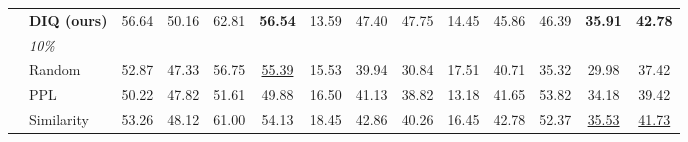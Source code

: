 \documentclass[letterpaper]{article} %
\newcommand{\TableLineColor}{\rowcolor{lightblue}}
\begin{document}
\begin{table}[!t]
\begin{adjustbox}{max width=1.0\textwidth}
\begin{tabular}{llcccccccccccc}
\TableLineColor \cellcolor{white}                   &  \textbf{DIQ (ours)}                                & 56.64                             & 50.16                             & 62.81                             & \textbf{56.54}                       & 13.59                            & 47.40                             & 47.75                             & 14.45                             & 45.86                             & 46.39                             & \textbf{35.91}                       & \textbf{42.78}                       \\ \cmidrule(l){2-14}
                                                    & \textit{10\%}                                      &                                   &                                   &                                   &                                      &                                  &                                   &                                   &                                   &                                   &                                   &                                      &                                      \\
                                                    & Random                                             & 52.87                             & 47.33                             & 56.75                             & \underline{55.39}                                & 15.53                            & 39.94                             & 30.84                             & 17.51                             & 40.71                             & 35.32                             & 29.98                                & 37.42                                \\
                                                    & PPL                                                & 50.22                             & 47.82                             & 51.61                             & 49.88                                & 16.50                            & 41.13                             & 38.82                             & 13.18                             & 41.65                             & 53.82                             & 34.18                                & 39.42                                \\
                                                    & Similarity                                         & 53.26                             & 48.12                             & 61.00                             & 54.13                                & 18.45                            & 42.86                             & 40.26                             & 16.45                             & 42.78                             & 52.37                             & \underline{35.53}                                & \underline{41.73}                                \\

\end{tabular}
\end{adjustbox}
\end{table}
\end{document}
